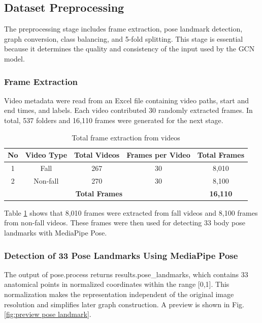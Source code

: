 \documentclass[10pt,TimesNewRoman,a4paper]{matrikenglish}
\begin{document}
\subsection{Dataset Preprocessing}
\label{IV.prapemrosesan}

The preprocessing stage includes frame extraction, pose landmark detection, graph conversion, class balancing, and 5-fold splitting. This stage is essential because it determines the quality and consistency of the input used by the GCN model.

\subsubsection{Frame Extraction}
\label{IV.ekstrak frame}

Video metadata were read from an Excel file containing video paths, start and end times, and labels. Each video contributed 30 randomly extracted frames. In total, 537 folders and 16,110 frames were generated for the next stage.

\begin{table}[H]
    \centering
    \caption{Total frame extraction from videos}
    \label{tab:total citra}
    \begin{tabular}{c c c c c}
        \hline
        \textbf{No} & \textbf{Video Type} & \textbf{Total Videos} & \textbf{Frames per Video} & \textbf{Total Frames} \\ \hline
        1 & Fall & 267 & 30 & 8,010 \\ 
        2 & Non-fall & 270 & 30 & 8,100 \\ \hline
        \multicolumn{4}{c}{\textbf{Total Frames}} & \textbf{16,110} \\ \hline
    \end{tabular}
\end{table}

Table \ref{tab:total citra} shows that 8,010 frames were extracted from fall videos and 8,100 frames from non-fall videos. These frames were then used for detecting 33 body pose landmarks with MediaPipe Pose.

\subsubsection{Detection of 33 Pose Landmarks Using MediaPipe Pose}
\label{IV.ekstrak skeleton}

The output of pose.process returns results.pose\_landmarks, which contains 33 anatomical points in normalized coordinates within the range [0,1]. This normalization makes the representation independent of the original image resolution and simplifies later graph construction. A preview is shown in Fig. \ref{fig:preview pose landmark}.
\end{document}

